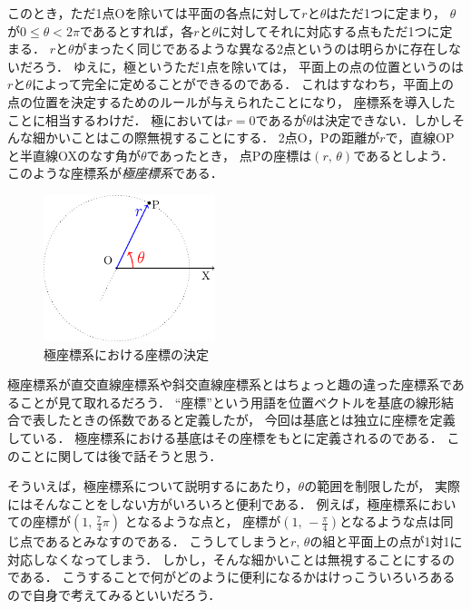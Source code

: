 このとき，ただ1点Oを除いては平面の各点に対して$r$と$\theta$はただ1つに定まり，
$\theta$が$0 \leq \theta < 2 \pi$であるとすれば，各$r$と$\theta$に対してそれに対応する点もただ1つに定まる．
$r$と$\theta$がまったく同じであるような異なる2点というのは明らかに存在しないだろう．
ゆえに，極というただ1点を除いては，
平面上の点の位置というのは$r$と$\theta$によって完全に定めることができるのである．
これはすなわち，平面上の点の位置を決定するためのルールが与えられたことになり，
座標系を導入したことに相当するわけだ．
極においては$r=0$であるが$\theta$は決定できない．しかしそんな細かいことはこの際無視することにする．
2点O，Pの距離が$r$で，直線OPと半直線OXのなす角が$\theta$であったとき，
点Pの座標は$( r, \, \theta )$であるとしよう．
このような座標系が\emph{極座標系}である．
\begin{figure}[h]
 \begin{center}
 \includegraphics[width=5cm]{picture/vecter10.pdf}
 \caption{極座標系における座標の決定}
\label{fig:kyokuzahyou}
 \end{center}
\end{figure}

極座標系が直交直線座標系や斜交直線座標系とはちょっと趣の違った座標系であることが見て取れるだろう．
``座標''という用語を位置ベクトルを基底の線形結合で表したときの係数であると定義したが，
今回は基底とは独立に座標を定義している．
極座標系における基底はその座標をもとに定義されるのである．
このことに関しては後で話そうと思う．

そういえば，極座標系について説明するにあたり，$\theta$の範囲を制限したが，
実際にはそんなことをしない方がいろいろと便利である．
例えば，極座標系においての座標が$ \displaystyle \left(1, \, \frac{7}{4} \pi \right)$ となるような点と，
座標が$\displaystyle \left(1, \, - \frac{\pi}{4} \right)$となるような点は同じ点であるとみなすのである．
こうしてしまうと$r, \, \theta$の組と平面上の点が1対1に対応しなくなってしまう．
しかし，そんな細かいことは無視することにするのである．
こうすることで何がどのように便利になるかはけっこういろいろあるので自身で考えてみるといいだろう．

